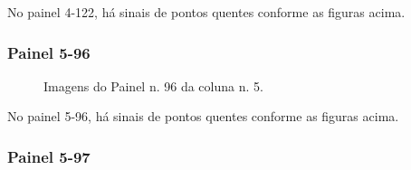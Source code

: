 \documentclass[dvipsnames]{article}%
\begin{document}
%
\FloatBarrier%
No painel 4{-}122, há sinais de pontos quentes conforme as figuras acima.\newline%
%
\subsubsection{Painel 5-96}%


\begin{figure}[h!]%
\centering%
%
\hfill%
%
\hfill%
%
\caption{Imagens do Painel n. 96 da coluna n. 5.}%
\end{figure}

%
\FloatBarrier%
No painel 5{-}96, há sinais de pontos quentes conforme as figuras acima.\newline%
%
\subsubsection{Painel 5-97}%
\end{document}
